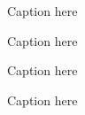 
\begin{figure}
	\centering
	\initialGrid
	\caption{Caption here}
	\label{fig:1:}
\end{figure}

\begin{figure}
	\centering
	\stabilizedInitialGrid
	\caption{Caption here}
	\label{fig:2:}
\end{figure}

\begin{figure}
	\centering
	\cutGrid
	\caption{Caption here}
	\label{fig:3:}
\end{figure}

\begin{figure}
	\centering
	\stabilizedCutGrid
	\caption{Caption here}
	\label{fig:4:}
\end{figure}